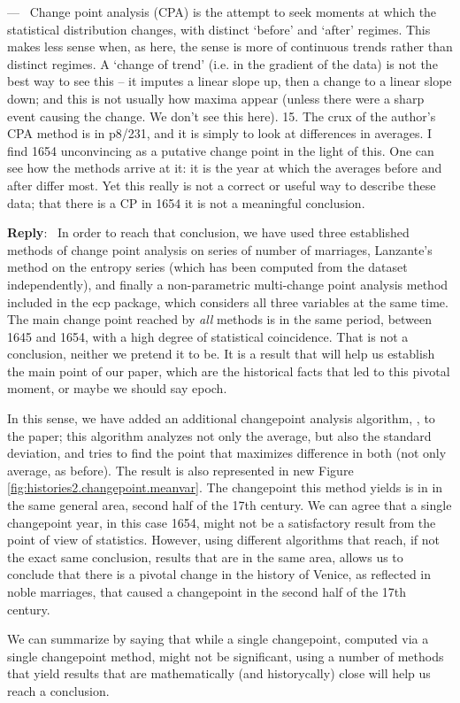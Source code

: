 \documentclass[11pt]{article}
\newcounter{reviewer}
\newcounter{point}[reviewer]
\renewcommand{\thepoint}{P\,\thereviewer.\arabic{point}}
\newenvironment{point}
   {\refstepcounter{point} \bigskip \noindent {\textbf{Reviewer~Point~\thepoint} } ---\ }
   {\par }
\newenvironment{reply}
   {\medskip \noindent \begin{sf}\textbf{Reply}:\  }
   {\medskip \end{sf}}
\begin{document}
\begin{point}
Change point analysis (CPA) is the attempt to seek moments at which
the statistical distribution changes, with distinct ‘before’ and ‘after’ regimes.
This makes less sense when, as here, the sense is more of continuous trends
rather than distinct regimes. A ‘change of trend’ (i.e. in the gradient of the
data) is not the best way to see this – it imputes a linear slope up, then a
change to a linear slope down; and this is not usually how maxima appear
(unless there were a sharp event causing the change. We don’t see this here).
15. The crux of the author’s CPA method is in p8/231, and it is simply
to look at differences in averages. I find 1654 unconvincing as a putative
change point in the light of this. One can see how the methods arrive at it:
it is the year at which the averages before and after differ most. Yet this
really is not a correct or useful way to describe these data; that there is a
CP in 1654 it is not a meaningful conclusion.
\end{point}

\begin{reply}
In order to reach that conclusion, we have used three established methods of
change point analysis on series of number of marriages, Lanzante's method on the
entropy series (which has been computed from the dataset independently), and
finally a non-parametric multi-change point analysis method included in the {\sf
  ecp} package, which considers all three variables at the same time. The main
change point reached by {\em all} methods is in the same period, between 1645
and 1654, with a high degree of statistical coincidence. That is not a
conclusion, neither we pretend it to be. It is a result that will help us
establish the main point of our paper, which are the historical facts that led
to this pivotal moment, or maybe we should say epoch.

In this sense, we have added an additional changepoint analysis algorithm,
\cite{killick}, to the paper; this algorithm analyzes not only the average, but
also the standard deviation, and tries to find the point that maximizes
difference in both (not only average, as before). The result is also
represented in new Figure \ref{fig:histories2.changepoint.meanvar}.
The changepoint this method yields is in in the same general area, second
half of the 17th century. We can agree that a single changepoint year, in this
case 1654, might not be a satisfactory result from the point of view of
statistics. However, using different algorithms that reach, if not the exact
same conclusion, results that are in the same area, allows us to conclude that
there is a pivotal change in the history of Venice, as reflected in noble
marriages, that caused a changepoint in the second half of the 17th century.

We can summarize by saying that while a single changepoint, computed via a
single changepoint method, might not be significant, using a number of methods
that yield results that are mathematically (and historycally) close will help us
reach a conclusion.
\end{reply}
\end{document}
